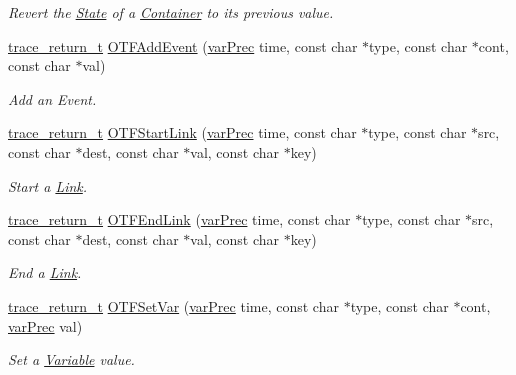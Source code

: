 \begin{DoxyCompactItemize}
\begin{DoxyCompactList}\small\item\em Revert the \hyperlink{structState}{State} of a \hyperlink{structContainer}{Container} to its previous value. \end{DoxyCompactList}\item 
\hyperlink{group__type_ga1f1b68fb37d7331f03a48ef0993a0788}{trace\-\_\-return\-\_\-t} \hyperlink{group__cotf_ga7b5fa3f1a3f5615fe9316c692e9bce3c}{O\-T\-F\-Add\-Event} (\hyperlink{group__type_gabda13d5bcd0cbdb094d655181a857e25}{var\-Prec} time, const char $\ast$type, const char $\ast$cont, const char $\ast$val)
\begin{DoxyCompactList}\small\item\em Add an Event. \end{DoxyCompactList}\item 
\hyperlink{group__type_ga1f1b68fb37d7331f03a48ef0993a0788}{trace\-\_\-return\-\_\-t} \hyperlink{group__cotf_ga0e6f15e063533999a4587f5aff536c4b}{O\-T\-F\-Start\-Link} (\hyperlink{group__type_gabda13d5bcd0cbdb094d655181a857e25}{var\-Prec} time, const char $\ast$type, const char $\ast$src, const char $\ast$dest, const char $\ast$val, const char $\ast$key)
\begin{DoxyCompactList}\small\item\em Start a \hyperlink{structLink}{Link}. \end{DoxyCompactList}\item 
\hyperlink{group__type_ga1f1b68fb37d7331f03a48ef0993a0788}{trace\-\_\-return\-\_\-t} \hyperlink{group__cotf_ga42c372c6ccb6362453c27f74df3a3dfc}{O\-T\-F\-End\-Link} (\hyperlink{group__type_gabda13d5bcd0cbdb094d655181a857e25}{var\-Prec} time, const char $\ast$type, const char $\ast$src, const char $\ast$dest, const char $\ast$val, const char $\ast$key)
\begin{DoxyCompactList}\small\item\em End a \hyperlink{structLink}{Link}. \end{DoxyCompactList}\item 
\hyperlink{group__type_ga1f1b68fb37d7331f03a48ef0993a0788}{trace\-\_\-return\-\_\-t} \hyperlink{group__cotf_ga5b0831b85cc3e6ebd78224a4199b1cfd}{O\-T\-F\-Set\-Var} (\hyperlink{group__type_gabda13d5bcd0cbdb094d655181a857e25}{var\-Prec} time, const char $\ast$type, const char $\ast$cont, \hyperlink{group__type_gabda13d5bcd0cbdb094d655181a857e25}{var\-Prec} val)
\begin{DoxyCompactList}\small\item\em Set a \hyperlink{structVariable}{Variable} value. \end{DoxyCompactList}\item 

\end{DoxyCompactItemize}

